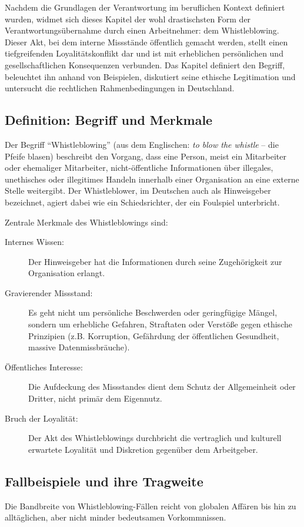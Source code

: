 \documentclass[
    12pt,               %
    a4paper,            %
    ngerman             %
]{scrartcl}
\begin{document}
Nachdem die Grundlagen der Verantwortung im beruflichen Kontext definiert wurden, widmet sich dieses Kapitel der wohl drastischsten Form der Verantwortungsübernahme durch einen Arbeitnehmer: dem Whistleblowing. Dieser Akt, bei dem interne Missstände öffentlich gemacht werden, stellt einen tiefgreifenden Loyalitätskonflikt dar und ist mit erheblichen persönlichen und gesellschaftlichen Konsequenzen verbunden. Das Kapitel definiert den Begriff, beleuchtet ihn anhand von Beispielen, diskutiert seine ethische Legitimation und untersucht die rechtlichen Rahmenbedingungen in Deutschland.

\subsection{Definition: Begriff und Merkmale}
Der Begriff \enquote{Whistleblowing} (aus dem Englischen: \textit{to blow the whistle} – die Pfeife blasen) beschreibt den Vorgang, dass eine Person, meist ein Mitarbeiter oder ehemaliger Mitarbeiter, nicht-öffentliche Informationen über illegales, unethisches oder illegitimes Handeln innerhalb einer Organisation an eine externe Stelle weitergibt. Der Whistleblower, im Deutschen auch als Hinweisgeber bezeichnet, agiert dabei wie ein Schiedsrichter, der ein Foulspiel unterbricht.

Zentrale Merkmale des Whistleblowings sind:
\begin{description}
    \item[Internes Wissen:] Der Hinweisgeber hat die Informationen durch seine Zugehörigkeit zur Organisation erlangt.
    \item[Gravierender Missstand:] Es geht nicht um persönliche Beschwerden oder geringfügige Mängel, sondern um erhebliche Gefahren, Straftaten oder Verstöße gegen ethische Prinzipien (z.B. Korruption, Gefährdung der öffentlichen Gesundheit, massive Datenmissbräuche).
    \item[Öffentliches Interesse:] Die Aufdeckung des Missstandes dient dem Schutz der Allgemeinheit oder Dritter, nicht primär dem Eigennutz.
    \item[Bruch der Loyalität:] Der Akt des Whistleblowings durchbricht die vertraglich und kulturell erwartete Loyalität und Diskretion gegenüber dem Arbeitgeber.
\end{description}

\subsection{Fallbeispiele und ihre Tragweite}
Die Bandbreite von Whistleblowing-Fällen reicht von globalen Affären bis hin zu alltäglichen, aber nicht minder bedeutsamen Vorkommnissen.
\end{document}
